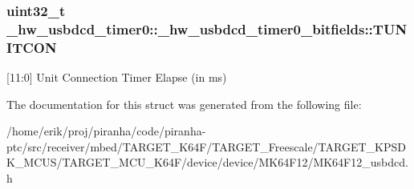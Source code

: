 \subsubsection[{\texorpdfstring{T\+U\+N\+I\+T\+C\+ON}{TUNITCON}}]{\setlength{\rightskip}{0pt plus 5cm}uint32\+\_\+t \+\_\+hw\+\_\+usbdcd\+\_\+timer0\+::\+\_\+hw\+\_\+usbdcd\+\_\+timer0\+\_\+bitfields\+::\+T\+U\+N\+I\+T\+C\+ON}\hypertarget{struct__hw__usbdcd__timer0_1_1__hw__usbdcd__timer0__bitfields_a6665e833a74af1ca55c5d4b208ff20eb}{}\label{struct__hw__usbdcd__timer0_1_1__hw__usbdcd__timer0__bitfields_a6665e833a74af1ca55c5d4b208ff20eb}
\mbox{[}11\+:0\mbox{]} Unit Connection Timer Elapse (in ms) 

The documentation for this struct was generated from the following file\+:\begin{DoxyCompactItemize}
\item 
/home/erik/proj/piranha/code/piranha-\/ptc/src/receiver/mbed/\+T\+A\+R\+G\+E\+T\+\_\+\+K64\+F/\+T\+A\+R\+G\+E\+T\+\_\+\+Freescale/\+T\+A\+R\+G\+E\+T\+\_\+\+K\+P\+S\+D\+K\+\_\+\+M\+C\+U\+S/\+T\+A\+R\+G\+E\+T\+\_\+\+M\+C\+U\+\_\+\+K64\+F/device/device/\+M\+K64\+F12/M\+K64\+F12\+\_\+usbdcd.\+h\end{DoxyCompactItemize}

